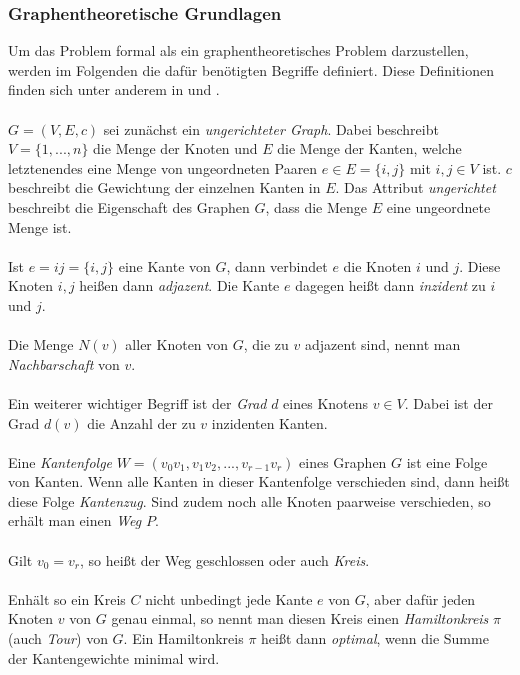 \documentclass[doktyp=barbeit, sprache=german]{TUBAFarbeiten}
\begin{document}
\subsubsection{Graphentheoretische Grundlagen} \label{graphbasics}
Um das Problem formal als ein graphentheoretisches Problem darzustellen, werden im Folgenden die dafür benötigten Begriffe definiert. Diese Definitionen finden sich unter anderem in \cite{graphKemnitz} und \cite{graphDiestel}.
\\\\$G = (V,E,c)$ sei zunächst ein \textit{ungerichteter Graph}. Dabei beschreibt $V = \{1,...,n\}$ die Menge der Knoten und $E$ die Menge der Kanten, welche letztenendes eine Menge von ungeordneten Paaren $e \in E = \{i,j\}$ mit $i,j \in V$ ist. $c$ beschreibt die Gewichtung der einzelnen Kanten in $E$. Das Attribut \textit{ungerichtet} beschreibt die Eigenschaft des Graphen $G$, dass die Menge $E$ eine ungeordnete Menge ist.
\\\\Ist $e = ij = \{i,j\}$ eine Kante von $G$, dann verbindet $e$ die Knoten $i$ und $j$. Diese Knoten $i,j$ heißen dann \textit{adjazent}. Die Kante $e$ dagegen heißt dann \textit{inzident} zu $i$ und $j$. 
\\\\Die Menge $N(v)$ aller Knoten von $G$, die zu $v$ adjazent sind, nennt man \textit{Nachbarschaft} von $v$.
\\\\Ein weiterer wichtiger Begriff ist der \textit{Grad} $d$ eines Knotens $v \in V$. Dabei ist der Grad $d(v)$ die Anzahl der zu $v$ inzidenten Kanten.
\\\\Eine \textit{Kantenfolge} $W = (v_0v_1,v_1v_2,...,v_{r-1}v_r)$ eines Graphen $G$ ist eine Folge von Kanten. Wenn alle Kanten in dieser Kantenfolge verschieden sind, dann heißt diese Folge \textit{Kantenzug}. Sind zudem noch alle Knoten paarweise verschieden, so erhält man einen \textit{Weg} $P$.
\\\\Gilt $v_0 = v_r$, so heißt der Weg geschlossen oder auch \textit{Kreis}.
\\\\Enhält so ein Kreis $C$ nicht unbedingt jede Kante $e$ von $G$, aber dafür jeden Knoten $v$ von $G$ genau einmal, so nennt man diesen Kreis einen \textit{Hamiltonkreis} $\pi$ (auch \textit{Tour}) von $G$. Ein Hamiltonkreis $\pi$ heißt dann \textit{optimal}, wenn die Summe der Kantengewichte minimal wird.
\end{document}
